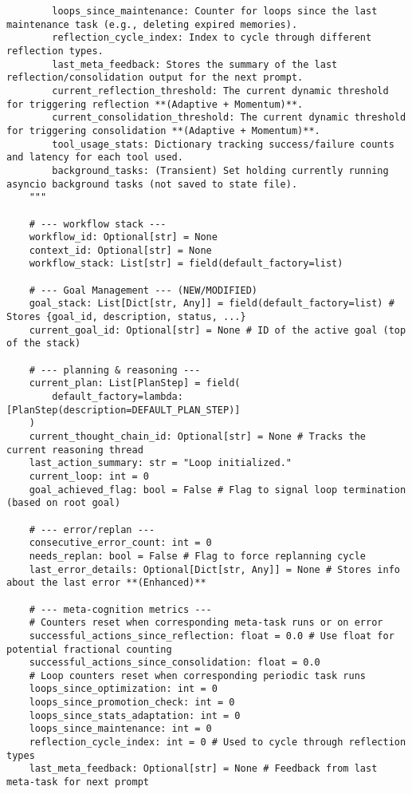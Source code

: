 \documentclass[12pt,a4paper]{article}
\begin{document}
\begin{pageablecode}
\begin{verbatim}
        loops_since_maintenance: Counter for loops since the last maintenance task (e.g., deleting expired memories).
        reflection_cycle_index: Index to cycle through different reflection types.
        last_meta_feedback: Stores the summary of the last reflection/consolidation output for the next prompt.
        current_reflection_threshold: The current dynamic threshold for triggering reflection **(Adaptive + Momentum)**.
        current_consolidation_threshold: The current dynamic threshold for triggering consolidation **(Adaptive + Momentum)**.
        tool_usage_stats: Dictionary tracking success/failure counts and latency for each tool used.
        background_tasks: (Transient) Set holding currently running asyncio background tasks (not saved to state file).
    """

    # --- workflow stack ---
    workflow_id: Optional[str] = None
    context_id: Optional[str] = None
    workflow_stack: List[str] = field(default_factory=list)

    # --- Goal Management --- (NEW/MODIFIED)
    goal_stack: List[Dict[str, Any]] = field(default_factory=list) # Stores {goal_id, description, status, ...}
    current_goal_id: Optional[str] = None # ID of the active goal (top of the stack)

    # --- planning & reasoning ---
    current_plan: List[PlanStep] = field(
        default_factory=lambda: [PlanStep(description=DEFAULT_PLAN_STEP)]
    )
    current_thought_chain_id: Optional[str] = None # Tracks the current reasoning thread
    last_action_summary: str = "Loop initialized."
    current_loop: int = 0
    goal_achieved_flag: bool = False # Flag to signal loop termination (based on root goal)

    # --- error/replan ---
    consecutive_error_count: int = 0
    needs_replan: bool = False # Flag to force replanning cycle
    last_error_details: Optional[Dict[str, Any]] = None # Stores info about the last error **(Enhanced)**

    # --- meta‑cognition metrics ---
    # Counters reset when corresponding meta-task runs or on error
    successful_actions_since_reflection: float = 0.0 # Use float for potential fractional counting
    successful_actions_since_consolidation: float = 0.0
    # Loop counters reset when corresponding periodic task runs
    loops_since_optimization: int = 0
    loops_since_promotion_check: int = 0
    loops_since_stats_adaptation: int = 0
    loops_since_maintenance: int = 0
    reflection_cycle_index: int = 0 # Used to cycle through reflection types
    last_meta_feedback: Optional[str] = None # Feedback from last meta-task for next prompt


\end{verbatim}
\end{pageablecode}
\end{document}
